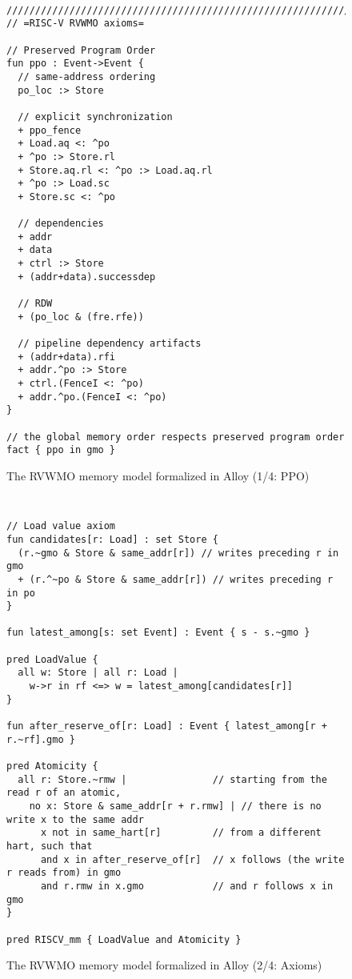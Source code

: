 \begin{figure}[h!]
  {
  \tt\bfseries\centering\footnotesize
  \begin{lstlisting}
////////////////////////////////////////////////////////////////////////////////
// =RISC-V RVWMO axioms=

// Preserved Program Order
fun ppo : Event->Event {
  // same-address ordering
  po_loc :> Store

  // explicit synchronization
  + ppo_fence
  + Load.aq <: ^po
  + ^po :> Store.rl
  + Store.aq.rl <: ^po :> Load.aq.rl
  + ^po :> Load.sc
  + Store.sc <: ^po

  // dependencies
  + addr
  + data
  + ctrl :> Store
  + (addr+data).successdep

  // RDW
  + (po_loc & (fre.rfe))

  // pipeline dependency artifacts
  + (addr+data).rfi
  + addr.^po :> Store
  + ctrl.(FenceI <: ^po)
  + addr.^po.(FenceI <: ^po)
}

// the global memory order respects preserved program order
fact { ppo in gmo }
\end{lstlisting}}
  \caption{The RVWMO memory model formalized in Alloy (1/4: PPO)}
  \label{fig:alloy1}
\end{figure}
\begin{figure}[h!]
  {
  \tt\bfseries\centering\footnotesize
  \begin{lstlisting}
// Load value axiom
fun candidates[r: Load] : set Store {
  (r.~gmo & Store & same_addr[r]) // writes preceding r in gmo
  + (r.^~po & Store & same_addr[r]) // writes preceding r in po
}

fun latest_among[s: set Event] : Event { s - s.~gmo }

pred LoadValue {
  all w: Store | all r: Load |
    w->r in rf <=> w = latest_among[candidates[r]]
}

fun after_reserve_of[r: Load] : Event { latest_among[r + r.~rf].gmo }

pred Atomicity {
  all r: Store.~rmw |               // starting from the read r of an atomic,
    no x: Store & same_addr[r + r.rmw] | // there is no write x to the same addr
      x not in same_hart[r]         // from a different hart, such that
      and x in after_reserve_of[r]  // x follows (the write r reads from) in gmo
      and r.rmw in x.gmo            // and r follows x in gmo
}

pred RISCV_mm { LoadValue and Atomicity }
\end{lstlisting}}
  \caption{The RVWMO memory model formalized in Alloy (2/4: Axioms)}
  \label{fig:alloy2}
\end{figure}
